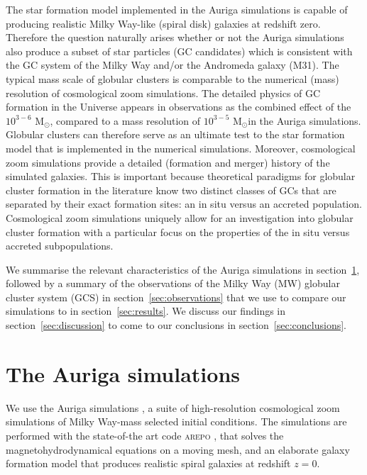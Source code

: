 \documentclass[a4paper,fleqn,usenatbib]{mnras}
\newcommand{\Sun}[0]{\ensuremath{_{\odot}}}
\begin{document}
The star formation model implemented in the Auriga simulations is capable of 
producing realistic Milky Way-like (spiral disk) galaxies at redshift zero. Therefore 
the question naturally arises whether or not the Auriga simulations also produce
a subset of star particles (GC candidates) which is consistent with the GC system
of the Milky Way and/or the Andromeda galaxy (M31). The typical mass scale of 
globular clusters is comparable to the numerical (mass) resolution of cosmological 
zoom simulations. The detailed physics of GC formation in the Universe appears in
observations as the combined effect of the $10^{3-6}$ M\Sun, compared to a mass 
resolution of $10^{3-5}$ M\Sun in the Auriga simulations. Globular clusters can 
therefore serve as an ultimate test to the star formation model that is implemented 
in the numerical simulations. Moreover, cosmological zoom simulations provide a
detailed (formation and merger) history of the simulated galaxies. This is 
important because theoretical paradigms for globular cluster formation in the 
literature know two distinct classes of GCs that are separated by their exact 
formation sites: an in situ versus an accreted population. Cosmological zoom 
simulations uniquely allow for an investigation into globular cluster formation 
with a particular focus on the properties of the in situ versus accreted subpopulations.


We summarise the relevant characteristics of the Auriga simulations in
section~\ref{sec:auriga}, followed by a summary of the observations of the
Milky Way (MW) globular cluster system (GCS) in section~\ref{sec:observations}
that we use to compare our simulations to in section~\ref{sec:results}. We
discuss our findings in section~\ref{sec:discussion} to come to our conclusions
in section~\ref{sec:conclusions}.


\section{The Auriga simulations}
\label{sec:auriga}
We use the Auriga simulations \citep[][hereafter G17]{2017MNRAS.467..179G}, a
suite of high-resolution cosmological zoom simulations of Milky Way-mass
selected initial conditions. The simulations are performed with the
state-of-the art code \textsc{arepo} \citep{2010MNRAS.401..791S,
2016MNRAS.455.1134P}, that solves the magnetohydrodynamical equations on a
moving mesh, and an elaborate galaxy formation model that produces realistic
spiral galaxies at redshift $z=0$.
\end{document}
